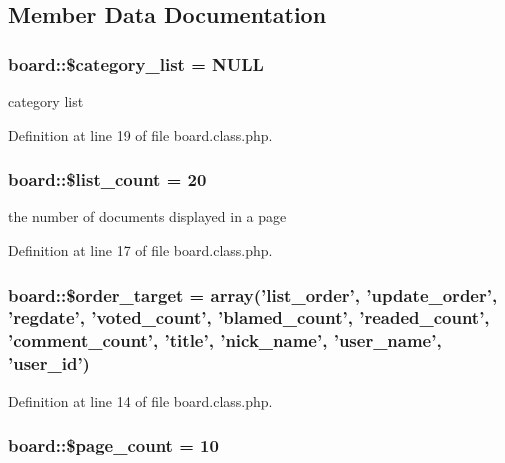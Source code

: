 \subsection{Member Data Documentation}
\hypertarget{classboard_aee8ebe65314796fea517f8f7875a4b8f}{
\subsubsection[{\$category\-\_\-list}]{\setlength{\rightskip}{0pt plus 5cm}board\-::\$category\-\_\-list = N\-U\-L\-L}}\label{classboard_aee8ebe65314796fea517f8f7875a4b8f}


category list 



Definition at line 19 of file board.\-class.\-php.

\hypertarget{classboard_ab66c6932a082c110ebd921c0be8d6788}{
\subsubsection[{\$list\-\_\-count}]{\setlength{\rightskip}{0pt plus 5cm}board\-::\$list\-\_\-count = 20}}\label{classboard_ab66c6932a082c110ebd921c0be8d6788}


the number of documents displayed in a page 



Definition at line 17 of file board.\-class.\-php.

\hypertarget{classboard_a66d1965fe6a51e8143499adeaf3998cc}{
\subsubsection[{\$order\-\_\-target}]{\setlength{\rightskip}{0pt plus 5cm}board\-::\$order\-\_\-target = array('list\-\_\-order', 'update\-\_\-order', 'regdate', 'voted\-\_\-count', 'blamed\-\_\-count', 'readed\-\_\-count', 'comment\-\_\-count', '{\bf title}', '{\bf nick\-\_\-name}', '{\bf user\-\_\-name}', '{\bf user\-\_\-id}')}}\label{classboard_a66d1965fe6a51e8143499adeaf3998cc}


Definition at line 14 of file board.\-class.\-php.

\hypertarget{classboard_ab5d2d3925f753039483da2c65076122b}{
\subsubsection[{\$page\-\_\-count}]{\setlength{\rightskip}{0pt plus 5cm}board\-::\$page\-\_\-count = 10}}\label{classboard_ab5d2d3925f753039483da2c65076122b}


